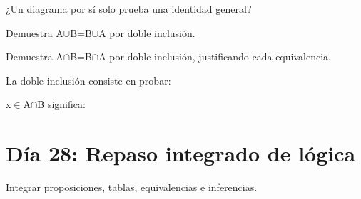 \begin{activity}[id=dia-27-corta-06,type=short,weight=1]

¿Un diagrama por sí solo prueba una identidad general?

\end{activity}

\begin{activity}[id=dia-27-desarrollo-01,type=long,weight=2]

Demuestra A\(\cup\)B=B\(\cup\)A por doble inclusión.

\end{activity}

\begin{activity}[id=dia-27-desarrollo-02,type=long,weight=2]

Demuestra A\(\cap\)B=B\(\cap\)A por doble inclusión, justificando cada equivalencia.

\end{activity}

\begin{activity}[id=dia-27-opcion-01,type=choice,weight=1]

La doble inclusión consiste en probar:





\end{activity}

\begin{activity}[id=dia-27-opcion-02,type=choice,weight=1]

x\(\in\)A\(\cap\)B significa:





\end{activity}

\section{Día 28: Repaso integrado de lógica}

\begin{lesson}[id=dia-28-lectura,weight=0]

Integrar proposiciones, tablas, equivalencias e inferencias.

\end{lesson}

